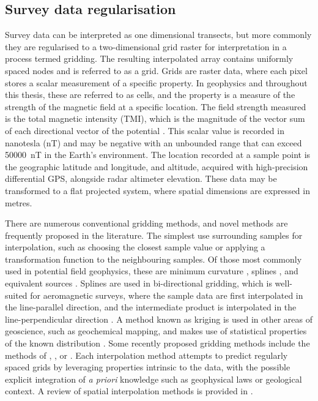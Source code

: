 \subsection{Survey data regularisation}
\label{sec:introgrids}
Survey data can be interpreted as one dimensional transects, but more commonly they are regularised to a two-dimensional grid raster for interpretation in a process termed gridding.
The resulting interpolated array contains uniformly spaced nodes and is referred to as a grid.
Grids are raster data, where each pixel stores a scalar measurement of a specific property.
In geophysics and throughout this thesis, these are referred to as cells, and the property is a measure of the strength of the magnetic field at a specific location.
The field strength measured is the total magnetic intensity (TMI), which is the magnitude of the vector sum of each directional vector of the potential \parencite{blakelyPotentialTheoryGravity1996}.
This scalar value is recorded in nanotesla (nT) and may be negative with an unbounded range that can exceed \qty{50000}{\nano\tesla} in the Earth's environment.
The location recorded at a sample point is the geographic latitude and longitude, and altitude, acquired with high-precision differential GPS, alongside radar altimeter elevation.
These data may be transformed to a flat projected system, where spatial dimensions are expressed in metres.

There are numerous conventional gridding methods, and novel methods are frequently proposed in the literature.
The simplest use surrounding samples for interpolation, such as choosing the closest sample value or applying a transformation function to the neighbouring samples.
Of those most commonly used in potential field geophysics, these are minimum curvature \parencite{briggsMachineContouringUsing1974}, splines \parencite{bhattacharyyaBicubicSplineInterpolation1969,shureHarmonicSplinesGeomagnetic1982,smithGriddingContinuousCurvature1990}, and equivalent sources \parencite{dampneyEquivalentSourceTechnique1969, solerBetterStrategyInterpolating2020}.
Splines are used in bi-directional gridding, which is well-suited for aeromagnetic surveys, where the sample data are first interpolated in the line-parallel direction, and the intermediate product is interpolated in the line-perpendicular direction \parencite{dentithGeophysicsMineralExploration2014}.
A method known as kriging is used in other areas of geoscience, such as geochemical mapping, and makes use of statistical properties of the known distribution \parencite{hansenInterpretiveGriddingAnisotropic1993,davis1986statistics}.
Some recently proposed gridding methods include the methods of \textcite{naprstekNewMethodInterpolating2019}, \textcite{xuGravityAnomalyReconstruction2019}, or \textcite{chenPotentialFieldData2022}.
Each interpolation method attempts to predict regularly spaced grids by leveraging properties intrinsic to the data, with the possible explicit integration of \emph{a priori} knowledge such as geophysical laws or geological context.
A review of spatial interpolation methods is provided in \textcite{liReviewComparativeStudies2011}.

